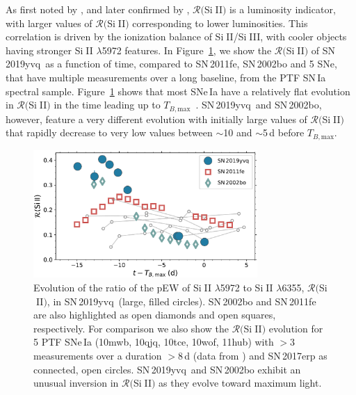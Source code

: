 \documentclass[twocolumn]{aastex63}
\def\ion#1#2{#1$\;${\footnotesize\rm{#2}}\relax}
\newcommand{\tbmax}{$T_{B,\mathrm{max}}$}
\newcommand{\sn}{SN\,2019yvq}
\begin{document}
As first noted by \citet{Nugent95}, and later confirmed by
\citet{Hachinger08}, $\mathcal{R}($\ion{Si}{II}$)$ is a luminosity indicator,
with larger values of $\mathcal{R}($\ion{Si}{II}$)$ corresponding to lower
luminosities. This correlation is driven by the ionization balance of
\ion{Si}{II}/\ion{Si}{III}, with cooler objects having stronger \ion{Si}{II}
$\lambda$5972 features. In Figure~\ref{fig:r_evo}, we show the
$\mathcal{R}($\ion{Si}{II}$)$ of \sn\ as a function of time, compared to
SN\,2011fe, SN\,2002bo and 5 SNe, that have multiple measurements over a long
baseline, from the PTF SN\,Ia spectral sample. Figure~\ref{fig:r_evo} shows
that most SNe\,Ia have a relatively flat evolution in
$\mathcal{R}($\ion{Si}{II}$)$ in the time leading up to \tbmax\ \citep[see
also][]{Riess98a}. \sn\ and SN\,2002bo, however, feature a very different
evolution with initially large values of $\mathcal{R}($\ion{Si}{II}$)$ that
rapidly decrease to very low values between $\sim$10 and $\sim$5\,d before
\tbmax.

\begin{figure}
    \centering
    \includegraphics[width=3.35in]{./figures/R_evolution.pdf}
    \caption{Evolution of the ratio of the pEW of \ion{Si}{II} $\lambda$5972
    to \ion{Si}{II} $\lambda$6355, $\mathcal{R}($\ion{Si}{II}$)$, in \sn\
    (large, filled circles). SN\,2002bo \citep[data from][]{Benetti04} and
    SN\,2011fe \citep[data from][]{Pereira13} are also highlighted as open
    diamonds and open squares, respectively. For comparison we also show the
    $\mathcal{R}($\ion{Si}{II}$)$ evolution for 5 PTF SNe\,Ia (10mwb, 10qjq,
    10tce, 10wof, 11hub) with $> 3$ measurements over a duration $> 8$\,d
    (data from \citealt{Maguire14}) and SN\,2017erp \citep[data
    from][]{Brown19} as connected, open circles. \sn\ and SN\,2002bo exhibit
    an unusual inversion in $\mathcal{R}($\ion{Si}{II}$)$ as they evolve
    toward maximum light.}
    \label{fig:r_evo}
\end{figure}
\end{document}
